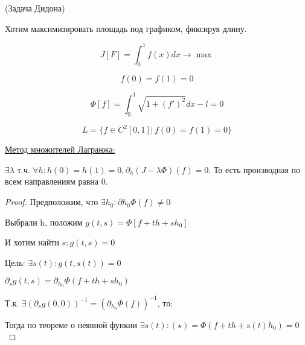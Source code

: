 \begin{example} (Задача Дидона)






Хотим максимизировать площадь под графиком, фиксируя длину.

\[
    J[F] = \int_0^1 f(x) dx \to \max
\]

\[
    f(0) = f(1) = 0
\]

\[
    \Phi[f] = \int_0^1 \sqrt{1 + (f')^2} dx - l = 0
\]

\[
    L = \{ f \in C^2 [0, 1] |\, f(0) = f(1) = 0 \}
\]

\underline{Метод множителей Лагранжа: } 

$\exists \lambda$ т.ч. $\forall h : h(0) = h(1) = 0, \partial_h(J - \lambda \Phi)(f) = 0$. То есть производная по всем направлениям равна 0.

\begin{proof}

Предположим, что $\exists h_0 : \partial h_0 \Phi(f) \neq 0$


Выбрали h, положим $g(t, s) = \Phi[f + th + sh_0]$

И хотим найти $s : g(t, s) = 0$

Цель: $\exists s(t) : g(t, s(t)) = 0$

$\partial_s g(t, s) = \partial_{h_0} \Phi(f + th + sh_0) $

Т.к. $\exists (\partial_s g(0, 0)) ^ {-1} = (\partial_{h_0} \Phi (f)) ^ {-1}$, то:

Тогда по теореме о неявной функии $\exists s(t) : (\star) = \Phi(f + th + s(t)h_0) = 0$


\end{proof}
\end{example}
